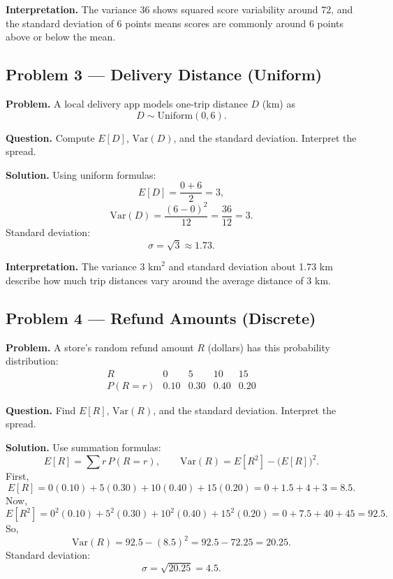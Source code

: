 \begin{ExamProblems}
\textbf{Interpretation.}
The variance 36 shows squared score variability around 72, and the standard deviation of 6 points means scores are commonly around 6 points above or below the mean.


\item
\subsection*{Problem 3 — Delivery Distance (Uniform)}

\textbf{Problem.}
A local delivery app models one-trip distance \(D\) (km) as
\[
D\sim \text{Uniform}(0,6).
\]

\textbf{Question.} Compute \(E[D]\), \(\mathrm{Var}(D)\), and the standard deviation. Interpret the spread.

\textbf{Solution.}
Using uniform formulas:
\[
E[D]=\frac{0+6}{2}=3,
\]
\[
\mathrm{Var}(D)=\frac{(6-0)^2}{12}=\frac{36}{12}=3.
\]
Standard deviation:
\[
\sigma=\sqrt{3}\approx 1.73.
\]

\textbf{Interpretation.}
The variance 3 \(\text{km}^2\) and standard deviation about 1.73 km describe how much trip distances vary around the average distance of 3 km.


\item
\subsection*{Problem 4 — Refund Amounts (Discrete)}

\textbf{Problem.}
A store's random refund amount \(R\) (dollars) has this probability distribution:
\[
\begin{array}{c|cccc}
R & 0 & 5 & 10 & 15 \\\hline
P(R=r) & 0.10 & 0.30 & 0.40 & 0.20
\end{array}
\]

\textbf{Question.} Find \(E[R]\), \(\mathrm{Var}(R)\), and the standard deviation. Interpret the spread.

\textbf{Solution.}
Use summation formulas:
\[
E[R]=\sum r\,P(R=r),\qquad \mathrm{Var}(R)=E[R^2]-\big(E[R]\big)^2.
\]
First,
\[
E[R]=0(0.10)+5(0.30)+10(0.40)+15(0.20)=0+1.5+4+3=8.5.
\]
Now,
\[
E[R^2]=0^2(0.10)+5^2(0.30)+10^2(0.40)+15^2(0.20)
=0+7.5+40+45=92.5.
\]
So,
\[
\mathrm{Var}(R)=92.5-(8.5)^2=92.5-72.25=20.25.
\]
Standard deviation:
\[
\sigma=\sqrt{20.25}=4.5.
\]


\end{ExamProblems}
